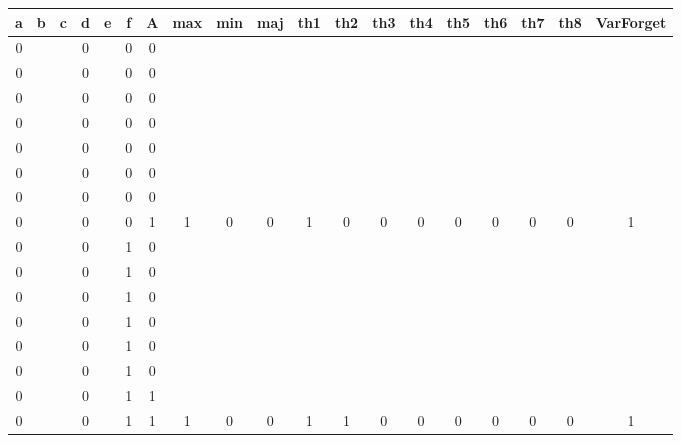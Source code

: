 \begin{table}[!tb]
    \centering
    \begin{tabular}{|c|c|c|c|c|c|c|c|c|c|c|c|c|c|c|c|c|c|c|}
        \hline
        \textbf{a} & \textbf{b} & \textbf{c} & \textbf{d} & \textbf{e} & \textbf{f} & \textbf{A} & \textbf{max} & \textbf{min} & \textbf{maj} & \textbf{th1} & \textbf{th2} & \textbf{th3} & \textbf{th4} & \textbf{th5} & \textbf{th6} & \textbf{th7} & \textbf{th8} & \textbf{VarForget} \\ \hline
        \rowcolor{gray!40} 0 &  &  & 0 &  & 0 & 0 &  &  &  &  &  &  &  &  &  &  &  &  \\ \hline
        \rowcolor{gray!40} 0 &  &  & 0 &  & 0 & 0 &  &  &  &  &  &  &  &  &  &  &  &  \\ \hline
        \rowcolor{gray!40} 0 &  &  & 0 &  & 0 & 0 &  &  &  &  &  &  &  &  &  &  &  &  \\ \hline
        \rowcolor{gray!40} 0 &  &  & 0 &  & 0 & 0 &  &  &  &  &  &  &  &  &  &  &  &  \\ \hline
        \rowcolor{gray!40} 0 &  &  & 0 &  & 0 & 0 &  &  &  &  &  &  &  &  &  &  &  &  \\ \hline
        \rowcolor{gray!40} 0 &  &  & 0 &  & 0 & 0 &  &  &  &  &  &  &  &  &  &  &  &  \\ \hline
        \rowcolor{gray!40} 0 &  &  & 0 &  & 0 & 0 &  &  &  &  &  &  &  &  &  &  &  &  \\ \hline
        \rowcolor{gray!40} 0 &  &  & 0 &  & 0 & 1 & 1 & 0 & 0 & 1 & 0 & 0 & 0 & 0 & 0 & 0 & 0 & 1 \\ \hline
        \rowcolor{blue!40} 0 &  &  & 0 &  & 1 & 0 &  &  &  &  &  &  &  &  &  &  &  &  \\ \hline
        \rowcolor{blue!40} 0 &  &  & 0 &  & 1 & 0 &  &  &  &  &  &  &  &  &  &  &  &  \\ \hline
        \rowcolor{blue!40} 0 &  &  & 0 &  & 1 & 0 &  &  &  &  &  &  &  &  &  &  &  &  \\ \hline
        \rowcolor{blue!40} 0 &  &  & 0 &  & 1 & 0 &  &  &  &  &  &  &  &  &  &  &  &  \\ \hline
        \rowcolor{blue!40} 0 &  &  & 0 &  & 1 & 0 &  &  &  &  &  &  &  &  &  &  &  &  \\ \hline
        \rowcolor{blue!40} 0 &  &  & 0 &  & 1 & 0 &  &  &  &  &  &  &  &  &  &  &  &  \\ \hline
        \rowcolor{blue!40} 0 &  &  & 0 &  & 1 & 1 &  &  &  &  &  &  &  &  &  &  &  &  \\ \hline
        \rowcolor{blue!40} 0 &  &  & 0 &  & 1 & 1 & 1 & 0 & 0 & 1 & 1 & 0 & 0 & 0 & 0 & 0 & 0 & 1 \\ \hline

\end{tabular}
\end{table}
